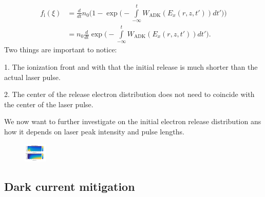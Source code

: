\begin{align}
\label{eqn:ADK_ionization_ratio_dt}
f_\mathrm{i}(\xi)&= \frac{d}{dt}n_0 \Big(1-\exp\Big(-\int \limits_{-\infty}^t W_\mathrm{ADK}(E_{x}(r,z,t'))dt'\Big)\Big)\\
&=n_0 \frac{d}{dt}\exp\Big(-\int \limits_{-\infty}^t W_\mathrm{ADK}(E_{x}(r,z,t'))dt'\Big).
\end{align}
Two things are important to notice:

1. The ionization front and with that the initial release is much shorter than the actual laser pulse.

2. The center of the release electron distribution does not need to coincide with the center of the laser pulse.


We now want to further investigate on the initial electron release distribution ans how it depends on laser peak intensity and pulse lengths.


\begin{figure}[h]
\begin{center}
\includegraphics[width=0.1\textwidth]{theory/images/edited/IonFrontVariation.pdf}
\end{center}
\end{figure}

\subsection{Dark current mitigation}

